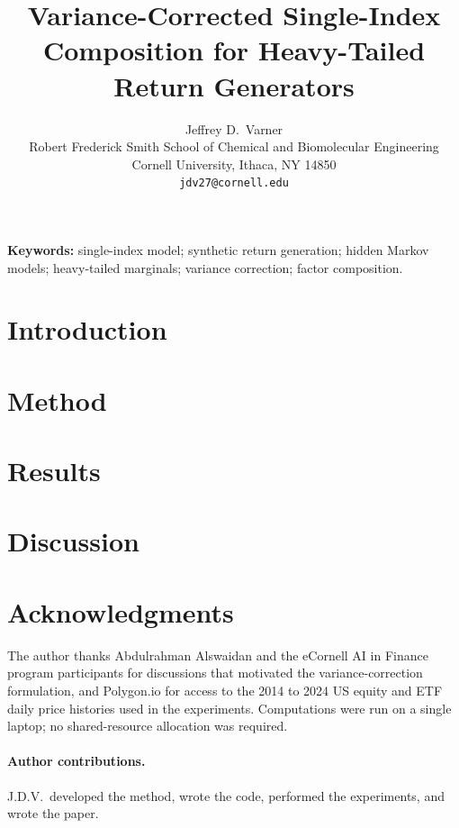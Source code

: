 \documentclass{article}
\title{Variance-Corrected Single-Index Composition for Heavy-Tailed Return Generators}
\author{%
  Jeffrey D.~Varner \\
  Robert Frederick Smith School of Chemical and Biomolecular Engineering\\
  Cornell University, Ithaca, NY 14850 \\
  \texttt{jdv27@cornell.edu} \\
}
\theoremstyle{definition}
\theoremstyle{remark}
\begin{document}

\maketitle

\begin{abstract}

\end{abstract}

\vspace{0.5em}
\noindent\textbf{Keywords:} single-index model; synthetic return generation; hidden Markov models; heavy-tailed marginals; variance correction; factor composition.

\section{Introduction}\label{sec:introduction}


\section{Method}\label{sec:method}


\section{Results}\label{sec:results}


\section{Discussion}\label{sec:discussion}


\section*{Acknowledgments}
The author thanks Abdulrahman Alswaidan and the eCornell AI in Finance
program participants for discussions that motivated the variance-correction
formulation, and Polygon.io for access to the 2014 to 2024 US equity and
ETF daily price histories used in the experiments. Computations were
run on a single laptop; no shared-resource allocation was required.

\paragraph{Author contributions.}
J.D.V.\ developed the method, wrote the code, performed the experiments, and wrote the paper.
\end{document}
